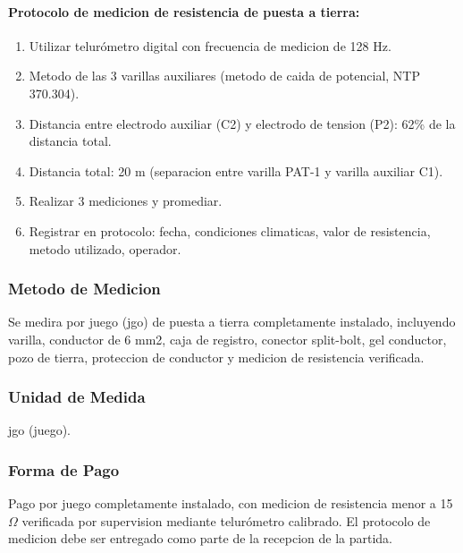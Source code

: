 \paragraph{Protocolo de medicion de resistencia de puesta a tierra:}
\begin{enumerate}
  \item Utilizar telurómetro digital con frecuencia de medicion de 128 Hz.
  \item Metodo de las 3 varillas auxiliares (metodo de caida de potencial, NTP 370.304).
  \item Distancia entre electrodo auxiliar (C2) y electrodo de tension (P2): 62\% de la distancia total.
  \item Distancia total: 20 m (separacion entre varilla PAT-1 y varilla auxiliar C1).
  \item Realizar 3 mediciones y promediar.
  \item Registrar en protocolo: fecha, condiciones climaticas, valor de resistencia, metodo utilizado, operador.
\end{enumerate}

\subsubsection{Metodo de Medicion}

Se medira por juego (jgo) de puesta a tierra completamente instalado, incluyendo varilla, conductor de 6 mm2, caja de registro, conector split-bolt, gel conductor, pozo de tierra, proteccion de conductor y medicion de resistencia verificada.

\subsubsection{Unidad de Medida}

jgo (juego).

\subsubsection{Forma de Pago}

Pago por juego completamente instalado, con medicion de resistencia menor a 15 $\Omega$ verificada por supervision mediante telurómetro calibrado. El protocolo de medicion debe ser entregado como parte de la recepcion de la partida.

